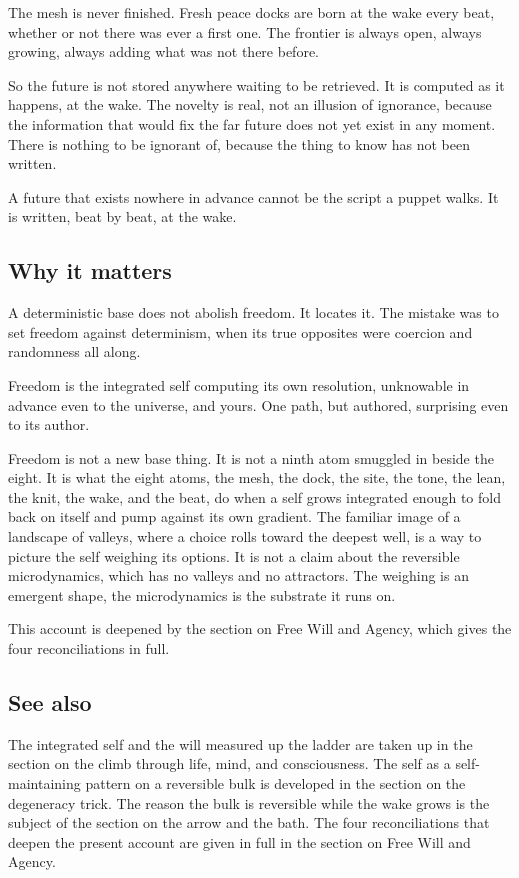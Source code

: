 The mesh is never finished. Fresh peace docks are born at the wake every beat, whether or not there was ever a first one. The frontier is always open, always growing, always adding what was not there before.

So the future is not stored anywhere waiting to be retrieved. It is computed as it happens, at the wake. The novelty is real, not an illusion of ignorance, because the information that would fix the far future does not yet exist in any moment. There is nothing to be ignorant of, because the thing to know has not been written.

\begin{principle}
A future that exists nowhere in advance cannot be the script a puppet walks. It is written, beat by beat, at the wake.
\end{principle}

\subsection{Why it matters}

A deterministic base does not abolish freedom. It locates it. The mistake was to set freedom against determinism, when its true opposites were coercion and randomness all along.

\begin{result}
Freedom is the integrated self computing its own resolution, unknowable in advance even to the universe, and yours. One path, but authored, surprising even to its author.
\end{result}

Freedom is not a new base thing. It is not a ninth atom smuggled in beside the eight. It is what the eight atoms, the mesh, the dock, the site, the tone, the lean, the knit, the wake, and the beat, do when a self grows integrated enough to fold back on itself and pump against its own gradient. The familiar image of a landscape of valleys, where a choice rolls toward the deepest well, is a way to picture the self weighing its options. It is not a claim about the reversible microdynamics, which has no valleys and no attractors. The weighing is an emergent shape, the microdynamics is the substrate it runs on.

This account is deepened by the section on Free Will and Agency, which gives the four reconciliations in full.

\subsection{See also}

The integrated self and the will measured up the ladder are taken up in the section on the climb through life, mind, and consciousness. The self as a self-maintaining pattern on a reversible bulk is developed in the section on the degeneracy trick. The reason the bulk is reversible while the wake grows is the subject of the section on the arrow and the bath. The four reconciliations that deepen the present account are given in full in the section on Free Will and Agency.
